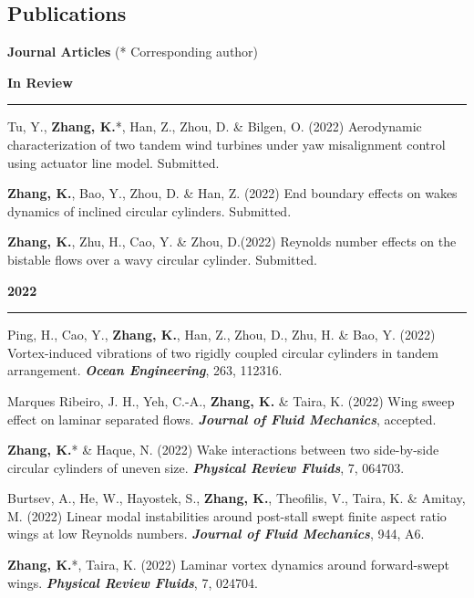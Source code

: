 \documentclass[10pt]{article}
\begin{document}
\subsection*{Publications}
{\bf \color{Blue}Journal Articles} (*  Corresponding author)
{\small
\begin{etaremune}
 \item [] {\bf \color{Blue} In Review \rule{13.8cm}{0.2mm}} 

 \item Tu, Y., \textbf{Zhang, K.}*, Han, Z., Zhou, D. \& Bilgen, O. (2022) Aerodynamic characterization of two tandem wind turbines under yaw misalignment control using actuator line model. Submitted.
 
 \item \textbf{Zhang, K.}, Bao, Y., Zhou, D. \& Han, Z. (2022) End boundary effects on wakes dynamics of inclined circular cylinders. Submitted.
 
 \item \textbf{Zhang, K.}, Zhu, H., Cao, Y. \& Zhou, D.(2022) Reynolds number effects on the bistable flows over a wavy circular cylinder. Submitted.



 
 \item [] {\bf \color{Blue} 2022 \rule{14.8cm}{0.2mm}}
 
 \item Ping, H., Cao, Y., \textbf{Zhang, K.}, Han, Z., Zhou, D., Zhu, H. \& Bao, Y. (2022) Vortex-induced vibrations of two rigidly coupled circular cylinders in tandem arrangement. \textit{\textbf{Ocean Engineering}}, 263, 112316. 
 
 \item Marques Ribeiro, J. H., Yeh, C.-A., \textbf{Zhang, K.} \& Taira, K. (2022) Wing sweep effect on laminar separated flows.  \textit{\textbf{Journal of Fluid Mechanics}}, accepted. 

 \item \textbf{Zhang, K.}* \& Haque, N. (2022) Wake interactions between two side-by-side circular cylinders of uneven size.  \textit{\textbf{Physical Review Fluids}}, 7, 064703.

  \item Burtsev, A., He, W., Hayostek, S., \textbf{Zhang, K.}, Theofilis, V., Taira, K. \& Amitay, M. (2022) Linear modal instabilities around post-stall swept finite aspect ratio wings at low Reynolds numbers. \textit{\textbf{Journal of Fluid Mechanics}}, 944, A6.

  \item \textbf{Zhang, K.}*, Taira, K. (2022) Laminar vortex dynamics around forward-swept wings.  \textit{\textbf{Physical Review Fluids}}, 7, 024704.


\end{etaremune}}
\end{document}
